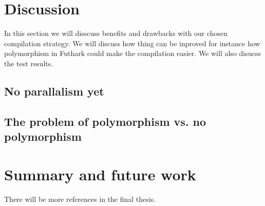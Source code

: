 \documentclass[11pt]{article}
\begin{document}
\section{Discussion}
In this section we will disscuss benefits and drawbacks with our chosen compilation strategy. We will discuss how thing can be inproved for instance how polymorphism in Futhark could make the compilation easier. We will also disucss the test results. 

\subsection{No parallalism yet}

\subsection{The problem of polymorphism vs. no polymorphism}

\section{Summary and future work}




{}


There will be more references in the final thesis. 
\end{document}
